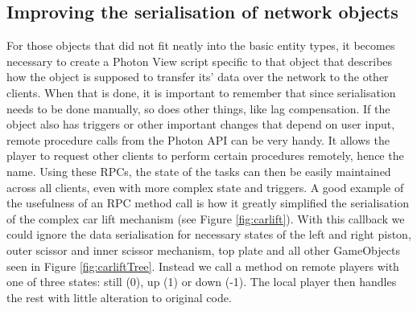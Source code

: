 \subsection{Improving the serialisation of network objects}
For those objects that did not fit neatly into the basic entity types, it becomes necessary to create a Photon View script specific to that object that describes how the object is supposed to transfer its' data over the network to the other clients. When that is done, it is important to remember that since serialisation needs to be done manually, so does other things, like lag compensation. If the object also has triggers or other important changes that depend on user input, remote procedure calls from the Photon API can be very handy. It allows the player to request other clients to perform certain procedures remotely, hence the name. Using these RPCs, the state of the tasks can then be easily maintained across all clients, even with more complex state and triggers. A good example of the usefulness of an RPC method call is how it greatly simplified the serialisation of the complex car lift mechanism (see Figure \ref{fig:carlift}). With this callback we could ignore the data serialisation for necessary states of the left and right piston, outer scissor and inner scissor mechanism, top plate and all other GameObjects seen in Figure \ref{fig:carliftTree}. Instead we call a method on remote players with one of three states: still (0), up (1) or down (-1). The local player then handles the rest with little alteration to original code.

